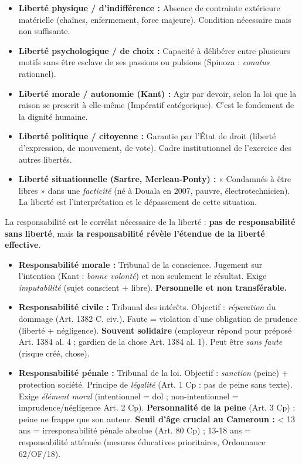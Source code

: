 \documentclass[11pt]{article}
\newcounter{popsec}
\newcounter{popsub}
\newcommand{\courssub}[1]{%
  \stepcounter{popsub}%
  \par\vspace{9pt}\noindent{\popxbold\fontsize{11.5}{13}\selectfont\color{popink}{\color{poporange}\thepopsec.\thepopsub}\hspace{6pt}#1}\par\nopagebreak\vspace{4pt}
}
\begin{document}
\begin{propriete}
\begin{itemize}
    \item \textbf{Liberté physique / d'indifférence :} Absence de contrainte extérieure matérielle (chaînes, enfermement, force majeure). Condition nécessaire mais non suffisante.
    \item \textbf{Liberté psychologique / de choix :} Capacité à délibérer entre plusieurs motifs sans être esclave de ses passions ou pulsions (Spinoza : \textit{conatus} rationnel).
    \item \textbf{Liberté morale / autonomie (Kant) :} Agir par devoir, selon la loi que la raison se prescrit à elle-même (Impératif catégorique). C'est le fondement de la dignité humaine.
    \item \textbf{Liberté politique / citoyenne :} Garantie par l'État de droit (liberté d'expression, de mouvement, de vote). Cadre institutionnel de l'exercice des autres libertés.
    \item \textbf{Liberté situationnelle (Sartre, Merleau-Ponty) :} « Condamnés à être libres » dans une \textit{facticité} (né à Douala en 2007, pauvre, électrotechnicien). La liberté est l'interprétation et le dépassement de cette situation.
\end{itemize}
\end{propriete}

\courssub{La responsabilité : définition et formes}
La responsabilité est le corrélat nécessaire de la liberté : \textbf{pas de responsabilité sans liberté}, mais \textbf{la responsabilité révèle l'étendue de la liberté effective}.

\begin{propriete}
\begin{itemize}
    \item \textbf{Responsabilité morale :} Tribunal de la conscience. Jugement sur l'intention (Kant : \textit{bonne volonté}) et non seulement le résultat. Exige \textit{imputabilité} (sujet conscient + libre). \textbf{Personnelle et non transférable.}
    \item \textbf{Responsabilité civile :} Tribunal des intérêts. Objectif : \textit{réparation} du dommage (Art. 1382 C. civ.). Faute = violation d'une obligation de prudence (liberté + négligence). \textbf{Souvent solidaire} (employeur répond pour préposé Art. 1384 al. 4 ; gardien de la chose Art. 1384 al. 1). Peut être \textit{sans faute} (risque créé, chose).
    \item \textbf{Responsabilité pénale :} Tribunal de la loi. Objectif : \textit{sanction} (peine) + protection société. Principe de \textit{légalité} (Art. 1 Cp : pas de peine sans texte). Exige \textit{élément moral} (intentionnel = dol ; non-intentionnel = imprudence/négligence Art. 2 Cp). \textbf{Personnalité de la peine} (Art. 3 Cp) : peine ne frappe que son auteur. \textbf{Seuil d'âge crucial au Cameroun :} < 13 ans = irresponsabilité pénale absolue (Art. 80 Cp) ; 13-18 ans = responsabilité atténuée (mesures éducatives prioritaires, Ordonnance 62/OF/18).
\end{itemize}
\end{propriete}
\end{document}
